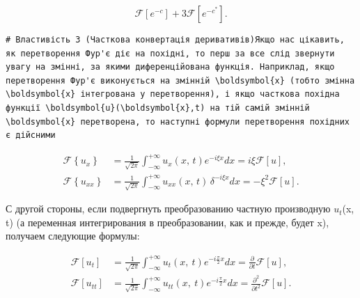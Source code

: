 \documentclass[
  ukrainian,
]{article}
\begin{document}
\[
\mathscr{F}[e^{-c}] + 3\mathscr{F}[e^{-c^*}].
\]

\begin{verbatim}
# Властивість 3 (Часткова конвертація деривативів)Якщо нас цікавить, як перетворення Фур'є діє на похідні, то перш за все слід звернути увагу на змінні, за якими диференційована функція. Наприклад, якщо перетворення Фур'є виконується на змінній \boldsymbol{x} (тобто змінна \boldsymbol{x} інтегрована у перетворення), і якщо часткова похідна функції \boldsymbol{u}(\boldsymbol{x},t) на тій самій змінній \boldsymbol{x} перетворена, то наступні формули перетворення похідних є дійсними
\end{verbatim}

\[
\begin{split} \mathcal{F}\left\{u_{x}\right\} &= \frac{1}{\sqrt{2\pi}} \int_{-\infty}^{+\infty} u_{x}\left(x,\,t\right) e^{-i\xi x} dx = i\xi \mathcal{F}\left[u\right], \\ \mathcal{F}\left\{u_{xx}\right\} &= \frac{1}{\sqrt{2\pi}} \int_{-\infty}^{+\infty} u_{xx}\left(x,\,t\right) \, \delta^{-i\xi x} dx = -\xi^{2} \mathcal{F}\left[u\right]. \end{split}
\]

С другой стороны, если подвергнуть преобразованию частную производную
\(u_t\)(x, t) (а переменная интегрирования в преобразовании, как и
прежде, будет x), получаем следующие формулы:

\[
\begin{aligned} \mathcal{F}\left[u_{t}\right] &= \frac{1}{\sqrt{2\pi}} \int_{-\infty}^{+\infty} u_{t}\left(x, \ t\right) e^{-i\frac{\pi}{2}x} dx = \frac{\partial}{\partial t} \mathcal{F}\left[u\right], \\ \mathcal{F}\left[u_{tt}\right] &= \frac{1}{\sqrt{2\pi}} \int_{-\infty}^{+\infty} u_{tt}\left(x, \ t\right) e^{-i\frac{\pi}{2}x} dx = \frac{\partial^{2}}{\partial t^{2}} \mathcal{F}\left[u\right]. \end{aligned}
\]
\end{document}
